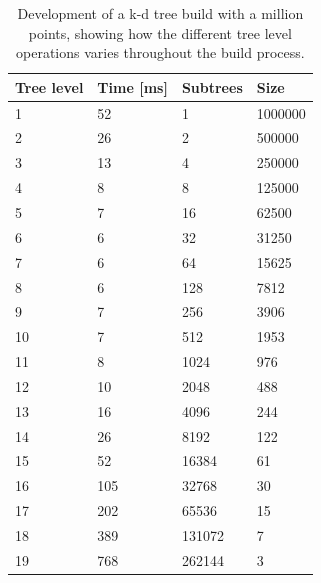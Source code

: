 \begin{table}[ht!]
\centering
    \begin{tabular}{|l|l|l|l|}
        \hline
        \textbf{Tree level} & \textbf{Time [ms]} & \textbf{Subtrees} & \textbf{Size}\\ \hline
        1          & 52       & 1                  & 1000000      \\ \hline
        2          & 26       & 2                  & 500000       \\ \hline
        3          & 13       & 4                  & 250000       \\ \hline
        4          & 8        & 8                  & 125000       \\ \hline
        5          & 7        & 16                 & 62500        \\ \hline
        6          & 6        & 32                 & 31250        \\ \hline
        7          & 6        & 64                 & 15625        \\ \hline
        8          & 6        & 128                & 7812         \\ \hline
        9          & 7        & 256                & 3906         \\ \hline
        10         & 7        & 512                & 1953         \\ \hline
        11         & 8        & 1024               & 976          \\ \hline
        12         & 10       & 2048               & 488          \\ \hline
        13         & 16       & 4096               & 244          \\ \hline
        14         & 26       & 8192               & 122          \\ \hline
        15         & 52       & 16384              & 61           \\ \hline
        16         & 105      & 32768              & 30           \\ \hline
        17         & 202      & 65536              & 15           \\ \hline
        18         & 389      & 131072             & 7            \\ \hline
        19         & 768      & 262144             & 3            \\ \hline
    \end{tabular}
    \caption{Development of a k-d tree build with a million points, showing how the different tree level operations varies throughout the build process.}
    \label{tbl:nvprc_balance_branch}
\end{table}

